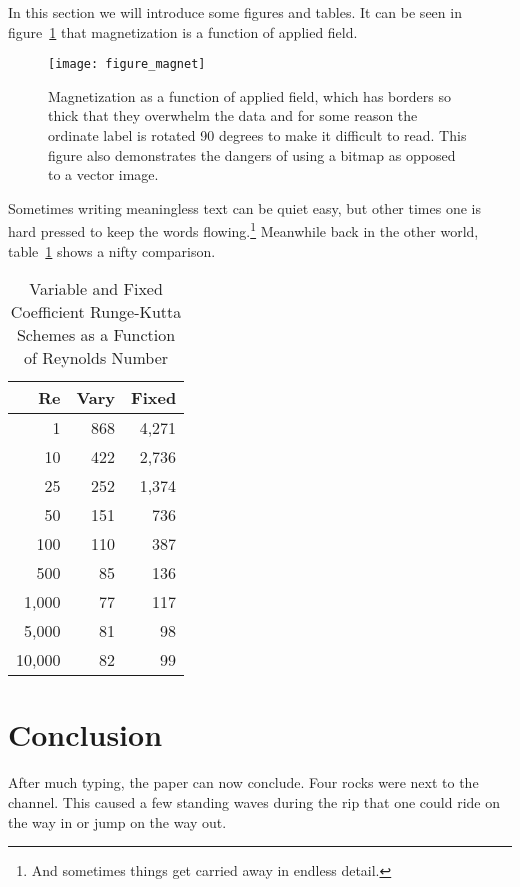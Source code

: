 \documentclass[]{aiaa-tc}%
\begin{document}
In this section we will introduce some figures and tables.
It can be seen in figure~\ref{f:magnetic_field} that magnetization is a
function of applied field.
\begin{figure}[htb]%
 \texttt{[image: figure\_magnet]}
 \caption{Magnetization as a function of applied field, which has
   borders so thick that they overwhelm the data and for some reason the
   ordinate label is rotated 90 degrees to make it difficult to
   read. This figure also demonstrates the dangers of using a bitmap
   as opposed to a vector image.}
 \label{f:magnetic_field}
\end{figure}
Sometimes writing meaningless text can be quiet easy, but other times
one is hard pressed to keep the words flowing.\footnote{And sometimes
things get carried away in endless detail.}
Meanwhile back in the other world, table~\ref{t:scheme_comparison} shows
a nifty comparison.
\begin{table}%
 \begin{center}
  \caption{Variable and Fixed Coefficient Runge-Kutta Schemes as a
           Function of Reynolds Number}
  \label{t:scheme_comparison}
  \begin{tabular}{rrr}
       Re & Vary & Fixed \\\hline
        1 &  868 & 4,271 \\
       10 &  422 & 2,736 \\
       25 &  252 & 1,374 \\
       50 &  151 &   736 \\
      100 &  110 &   387 \\
      500 &   85 &   136 \\
    1,000 &   77 &   117 \\
    5,000 &   81 &    98 \\
   10,000 &   82 &    99
  \end{tabular}
 \end{center}
\end{table}

\section{Conclusion}

After much typing, the paper can now conclude.
Four rocks were next to the channel.
This caused a few standing waves during the rip that one could ride on
the way in or jump on the way out.
\end{document}
